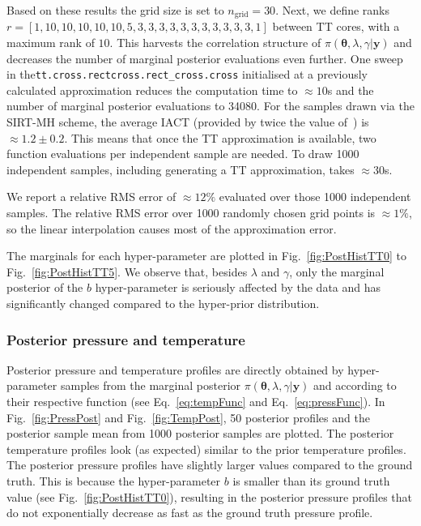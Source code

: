 Based on these results the grid size is set to $n_{\text{grid}} = 30$.
Next, we define ranks $r =[ 1,  10,  10, 10, 10, 10, 5, 3, 3, 3, 3, 3, 3 , 3, 3, 3, 3, 3, 1]$ between TT cores, with a maximum rank of $10$.
This harvests the correlation structure of $\pi(\bm{\theta},\lambda,\gamma  | \bm{y})$ and decreases the number of marginal posterior evaluations even further.
One sweep in the\linebreak \texttt{tt.cross.rectcross.rect\_cross.cross} initialised at a previously calculated approximation reduces the computation time to $\approx 10$s and the number of marginal posterior evaluations to 34080.
For the samples drawn via the SIRT-MH scheme, the average IACT (provided by twice the value of~\cite{wolff2004monte, drikHesse}) is $\approx 1.2 \pm 0.2$.
This means that once the TT approximation is available, two function evaluations per independent sample are needed.
To draw 1000 independent samples, including generating a TT approximation, takes $\approx30$s.

We report a relative RMS error of $\approx 12 \%$ evaluated over those 1000 independent samples.
The relative RMS error over 1000 randomly chosen grid points is $\approx 1\%$, so the linear interpolation causes most of the approximation error.

The marginals for each hyper-parameter are plotted in Fig.~\ref{fig:PostHistTT0} to Fig.~\ref{fig:PostHistTT5}.
We observe that, besides $\lambda$ and $\gamma$, only the marginal posterior of the $b$ hyper-parameter is seriously affected by the data and has significantly changed compared to the hyper-prior distribution.
\clearpage

\subsubsection{Posterior pressure and temperature}
Posterior pressure and temperature profiles are directly obtained by hyper-parameter samples from the marginal posterior $\pi(\bm{\theta},\lambda,\gamma  | \bm{y})$ and according to their respective function (see Eq.~\ref{eq:tempFunc} and Eq.~\ref{eq:pressFunc}).
In Fig.~\ref{fig:PressPost} and Fig.~\ref{fig:TempPost}, 50 posterior profiles and the posterior sample mean from 1000
posterior samples are plotted.
The posterior temperature profiles look (as expected) similar to the prior temperature profiles.
The posterior pressure profiles have slightly larger values compared to the ground truth.
This is because the hyper-parameter $b$ is smaller than its ground truth value (see Fig.~\ref{fig:PostHistTT0}), resulting in the posterior pressure profiles that do not exponentially decrease as fast as the ground truth pressure profile.

